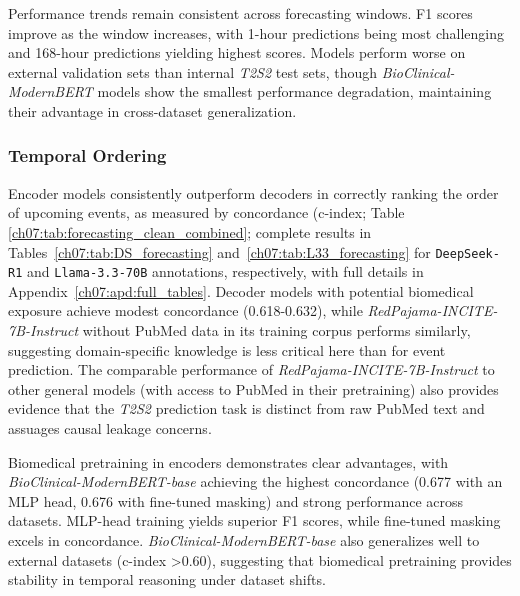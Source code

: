 Performance trends remain consistent across forecasting windows.
F1 scores improve as the window increases, with 1-hour predictions being most challenging and 168-hour predictions yielding highest scores.
Models perform worse on external validation sets than internal \textit{T2S2} test sets, though \textit{BioClinical-ModernBERT} models show the smallest performance degradation, maintaining their advantage in cross-dataset generalization.

\subsubsection{Temporal Ordering}\label{ch07:sec:ordering-results}

Encoder models consistently outperform decoders in correctly ranking the order of upcoming events, as measured by concordance (c-index; Table \ref{ch07:tab:forecasting_clean_combined}; complete results in Tables~\ref{ch07:tab:DS_forecasting} and~\ref{ch07:tab:L33_forecasting} for \texttt{DeepSeek-R1} and \texttt{Llama-3.3-70B} annotations, respectively, with full details in Appendix~\ref{ch07:apd:full_tables}. Decoder models with potential biomedical exposure achieve modest concordance (0.618-0.632), while \textit{RedPajama-INCITE-7B-Instruct} without PubMed data in its training corpus performs similarly, suggesting domain-specific knowledge is less critical here than for event prediction. The comparable performance of \textit{RedPajama-INCITE-7B-Instruct} to other general models (with access to PubMed in their pretraining) also provides evidence that the \textit{T2S2} prediction task is distinct from raw PubMed text and assuages causal leakage concerns.

{\raggedright
Biomedical pretraining in encoders demonstrates clear advantages, with \textit{BioClinical-ModernBERT-base} achieving the highest concordance (0.677 with an MLP head, 0.676 with fine-tuned masking) and strong performance across datasets.
MLP-head training yields superior F1 scores, while fine-tuned masking excels in concordance. \textit{BioClinical-ModernBERT-base} also generalizes well to external datasets (c-index \textgreater0.60), suggesting that biomedical pretraining provides stability in temporal reasoning under dataset shifts.\par}

